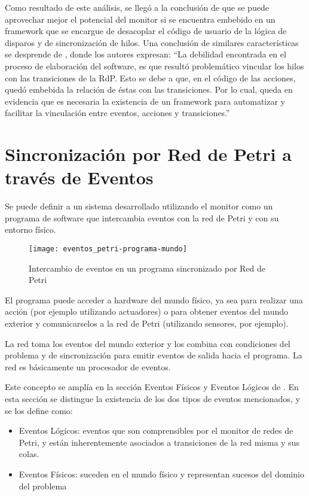 Como resultado de este análisis, se llegó a la conclusión de que se puede
aprovechar mejor el potencial del monitor si se encuentra embebido en un
framework que se encargue de desacoplar el código de usuario de la lógica de
disparos y de sincronización de hilos. 
Una conclusión de similares características se desprende de
\cite{Bentivegna-Ludemann}, donde los autores expresan: ``La debilidad encontrada en el proceso de elaboración del
software, es que resultó problemático vincular los hilos con las transiciones de
la RdP. Esto se debe a que, en el código de las acciones, quedó embebida la
relación de éstas con las transiciones. Por lo cual, queda en evidencia que es
necesaria la existencia de un framework para automatizar y facilitar la
vinculación entre eventos, acciones y transiciones.''


\section{Sincronización por Red de Petri a través de Eventos}
Se puede definir a un sistema desarrollado utilizando el monitor como un
programa de software que intercambia eventos con la red de Petri y con su
entorno físico.

\begin{figure}[h]
	\centering
	\texttt{[image: eventos\_petri-programa-mundo]}
	\caption{Intercambio de eventos en un programa sincronizado por Red de Petri}
	\label{fig:eventos_petri-programa-mundo}
\end{figure}

El programa puede acceder a hardware del mundo físico, ya sea para realizar una
acción (por ejemplo utilizando actuadores) o  para obtener eventos del mundo
exterior y comunicarselos a la red de Petri (utilizando sensores, por ejemplo).

La red toma los eventos del mundo exterior y los combina con condiciones del
problema y de sincronización para emitir eventos de salida hacia el programa. La
red es básicamente un procesador de eventos.\cite{chimp}

Este concepto se amplía en la sección Eventos Físicos y Eventos
Lógicos de \cite{chimp}. En esta sección se distingue la existencia de los dos
tipos de eventos mencionados, y se los define como:
  \begin{itemize}
    \item Eventos Lógicos: eventos que son comprensibles por el monitor de
    redes de Petri, y están inherentemente asociados a transiciones de la red
    misma y sus colas.
    \item Eventos Físicos: suceden en el mundo físico y representan sucesos del
    dominio del problema
  \end{itemize}

